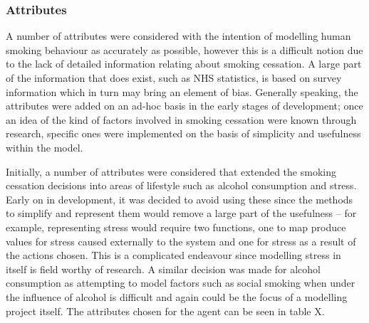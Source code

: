 \documentclass[]{report}
\begin{document}
\subsubsection{Attributes}
A number of attributes were considered with the intention of modelling human smoking behaviour as accurately as possible, however this is a difficult notion due to the lack of detailed information relating about smoking cessation. A large part of the information that does exist, such as NHS statistics\cite{NHS-43}, is based on survey information which in turn may bring an element of bias. Generally speaking, the attributes were added on an ad-hoc basis in the early stages of development; once an idea of the kind of factors involved in smoking cessation were known through research, specific ones were implemented on the basis of simplicity and usefulness within the model.

Initially, a number of attributes were considered that extended the smoking cessation decisions into areas of lifestyle such as alcohol consumption and stress\cite{malay}\cite{NHS-44}. Early on in development, it was decided to avoid using these since the methods to simplify and represent them would remove a large part of the usefulness – for example, representing stress would require two functions, one to map produce values for stress caused externally to the system and one for stress as a result of the actions chosen. This is a complicated endeavour since modelling stress in itself is field worthy of research. A similar decision was made for alcohol consumption as attempting to model factors such as social smoking when under the influence of alcohol is difficult and again could be the focus of a modelling project itself.
The attributes chosen for the agent can be seen in table X.
\end{document}
